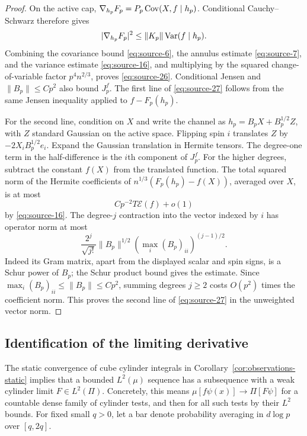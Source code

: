 \begin{proof}
On the active cap,
$\nabla_{h_p}F_p=P_p\operatorname{Cov}(X,f\mid h_p)$. Conditional Cauchy--Schwarz
therefore gives
\[
 |\nabla_{h_p}F_p|^2
 \le\|K_p\|\operatorname{Var}(f\mid h_p).
\]
Combining the covariance bound \eqref{eq:source-6}, the annulus estimate
\eqref{eq:source-7}, and the variance estimate
\eqref{eq:source-16}, and multiplying by the squared change-of-variable
factor $p^4n^{2/3}$, proves \eqref{eq:source-26}. Conditional Jensen and
$\|B_p\|\le Cp^2$ also bound $J_p^f$. The first line of
\eqref{eq:source-27} follows from the same Jensen inequality applied to
$f-F_p(h_p)$.

For the second line, condition on $X$ and write the channel as
$h_p=B_pX+B_p^{1/2}Z$, with $Z$ standard Gaussian on the active space.
Flipping spin $i$ translates $Z$ by $-2X_iB_p^{1/2}e_i$. Expand the
Gaussian translation in Hermite tensors. The degree-one term in the
half-difference is the $i$th component of $J_p^f$. For the higher
degrees, subtract the constant $f(X)$ from the translated function.
The total squared norm of the Hermite coefficients of
$n^{1/3}(F_p(h_p)-f(X))$, averaged over $X$, is at most
\[
 C p^{-2}T\mathcal E(f)+o(1)
\]
by \eqref{eq:source-16}. The degree-$j$ contraction into the vector
indexed by $i$ has operator norm at most
\[
 \frac{2^j}{\sqrt{j!}}\|B_p\|^{1/2}
           \left(\max_i(B_p)_{ii}\right)^{(j-1)/2}.
\]
Indeed its Gram matrix, apart from the displayed scalar and spin signs,
is a Schur power of $B_p$; the Schur product bound gives the estimate.
Since $\max_i(B_p)_{ii}\le\|B_p\|\le Cp^2$, summing degrees $j\ge2$
costs $O(p^2)$ times the coefficient norm. This proves the second line
of \eqref{eq:source-27} in the unweighted vector norm.
\end{proof}

\subsection{Identification of the limiting derivative}

The static convergence of cube cylinder integrals in
Corollary~\ref{cor:observations-static} implies that a bounded $L^2(\mu)$
sequence has a subsequence with a weak cylinder limit $F\in L^2(\Pi)$.
Concretely, this means
$\mu[f\psi(x)]\longrightarrow\Pi[F\psi]$ for a countable dense family
of cylinder tests, and then for all such tests by their $L^2$ bounds.
For fixed small $q>0$, let a bar denote probability averaging in
$d\log p$ over $[q,2q]$.

